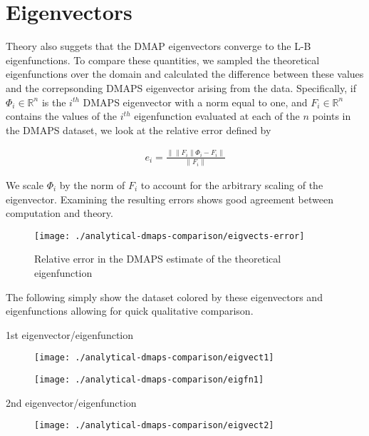 \documentclass[11pt]{article}
\begin{document}
\clearpage

\section{Eigenvectors}

Theory also suggets that the DMAP eigenvectors converge to the L-B
eigenfunctions. To compare these quantities, we sampled the
theoretical eigenfunctions over the domain and calculated the
difference between these values and the correpsonding DMAPS
eigenvector arising from the data. Specifically, if
$\Phi_i \in \mathbb{R}^n$ is the $i^{th}$ DMAPS eigenvector with a
norm equal to one, and
$F_i \in \mathbb{R}^n$ contains the values of the $i^{th}$
eigenfunction evaluated at each of the $n$ points in the DMAPS
dataset, we look at the relative error defined by

\begin{align*}
  e_i = \frac{\|\|F_i\|\Phi_i - F_i\|}{\|F_i\|}
\end{align*}

We scale $\Phi_i$ by the norm of $F_i$ to account for the arbitrary
scaling of the eigenvector. Examining the resulting errors shows good
agreement between computation and theory.

\begin{figure}[htbp]
  \centering
  \texttt{[image: ./analytical-dmaps-comparison/eigvects-error]}
  \caption{Relative error in the DMAPS estimate of the theoretical eigenfunction}
\end{figure}

The following simply show the dataset colored by these eigenvectors
and eigenfunctions allowing for quick qualitative comparison.

\clearpage

1st eigenvector/eigenfunction

\begin{figure}[htbp]
  \centering
  \texttt{[image: ./analytical-dmaps-comparison/eigvect1]}
\end{figure}

\begin{figure}[htbp]
  \centering
  \texttt{[image: ./analytical-dmaps-comparison/eigfn1]}
\end{figure}

\clearpage

2nd eigenvector/eigenfunction

\begin{figure}[htbp]
  \centering
  \texttt{[image: ./analytical-dmaps-comparison/eigvect2]}
\end{figure}
\end{document}
